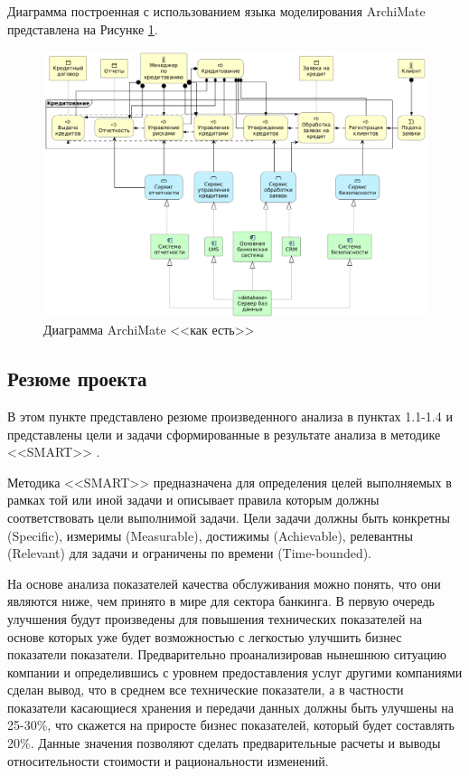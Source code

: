 \documentclass[14pt, a4paper]{extarticle}
\begin{document}
Диаграмма построенная с использованием языка моделирования ArchiMate
представлена на Рисунке \ref{fig:as_is_archimate}.

\begin{figure}[H]
	\centering
	\includegraphics[width=\textwidth]{as-is-archimate.png}
	\caption{Диаграмма ArchiMate <<как есть>>}
	\label{fig:as_is_archimate}
\end{figure}

\subsection{Резюме проекта}

В этом пункте представлено резюме произведенного анализа в пунктах 1.1-1.4 и 
представлены цели и задачи сформированные в результате анализа в методике
<<SMART>> \cite{smart2.0}.

Методика <<SMART>> предназначена для определения целей выполняемых в рамках
той или иной задачи и описывает правила которым должны соответствовать цели
выполнимой задачи. Цели задачи должны быть конкретны (Specific), измеримы
(Measurable), достижимы (Achievable), релевантны (Relevant) для задачи и
ограничены по времени (Time-bounded). 

На основе анализа показателей качества обслуживания можно понять, что они
являются ниже, чем принято в мире для сектора банкинга. В первую очередь
улучшения
будут произведены для повышения технических показателей на основе которых уже
будет возможностью с легкостью улучшить бизнес показатели показатели.
Предварительно проанализировав нынешнюю ситуацию компании и определившись с
уровнем предоставления услуг другими компаниями сделан вывод, что в среднем все
технические показатели, а в частности показатели касающиеся хранения и передачи
данных должны быть улучшены на 25-30\%, что скажется на приросте бизнес
показателей, который будет составлять 20\%. Данные значения позволяют сделать
предварительные расчеты и выводы относительности стоимости и рациональности
изменений.
\end{document}
